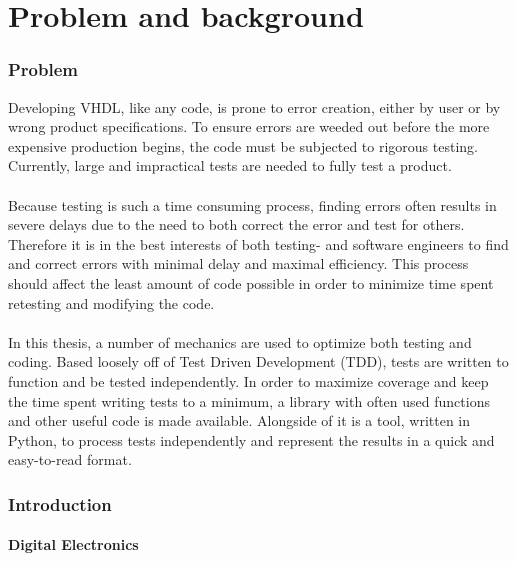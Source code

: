 \documentclass[11pt,british]{article}
\begin{document}

\part{Problem and background}


\section{Problem}

Developing VHDL, like any code, is prone to error creation, either by user or by wrong product specifications. To ensure errors are weeded out before the more expensive production begins, the code must be subjected to rigorous testing. Currently, large and impractical tests are needed to fully test a product.
\\
\\
Because testing is such a time consuming process, finding errors often
results in severe delays due to the need to both correct the error
and test for others. Therefore it is in the best interests of both
testing- and software engineers to find and correct errors
with minimal delay and maximal efficiency. This process should affect
the least amount of code possible in order to minimize time spent retesting
and modifying the code.
\\
\\
In this thesis, a number of mechanics are used to optimize both testing and coding. Based loosely off of Test Driven Development (TDD), tests are written to function and be tested independently.  In order to maximize coverage and keep the time spent writing tests to a minimum, a library with often used functions and other useful code is made available. Alongside of it is a tool, written in Python, to process tests independently  and represent the results in a quick and easy-to-read format.


\newpage{}


\section{Introduction}
\label{sec:intro}

\subsection{Digital Electronics}
\end{document}
